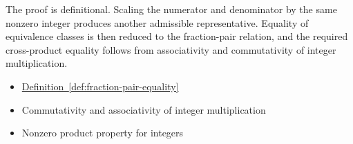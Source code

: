 \begin{remark*}
The proof is definitional. Scaling the numerator and denominator by the
same nonzero integer produces another admissible representative. Equality
of equivalence classes is then reduced to the fraction-pair relation, and
the required cross-product equality follows from associativity and
commutativity of integer multiplication.
\end{remark*}

\begin{dependencies}
\begin{itemize}
  \item \hyperref[def:fraction-pair-equality]{Definition~\ref*{def:fraction-pair-equality}}
  \item Commutativity and associativity of integer multiplication
  \item Nonzero product property for integers
\end{itemize}
\end{dependencies}




\clearpage
